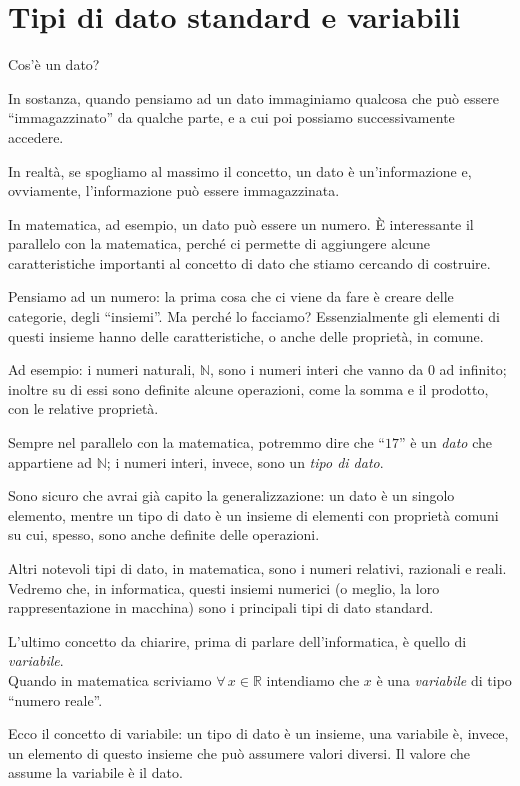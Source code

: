 
	\chapter{Tipi di dato standard e variabili}
	Cos'è un dato? 

	In sostanza, quando pensiamo ad un dato immaginiamo qualcosa che può essere ``immagazzinato'' da qualche parte, e a cui poi possiamo successivamente accedere. 
	
	In realtà, se spogliamo al massimo il concetto, un dato è un'informazione e, ovviamente, l'informazione può essere immagazzinata.
	
	In matematica, ad esempio, un dato può essere un numero. \`E interessante il parallelo con la matematica, perché ci permette di aggiungere alcune caratteristiche importanti al concetto di dato che stiamo cercando di costruire. 
	
	Pensiamo ad un numero: la prima cosa che ci viene da fare è creare delle categorie, degli ``insiemi''. Ma perché lo facciamo? Essenzialmente gli elementi di questi insieme hanno delle caratteristiche, o anche delle proprietà, in comune. 
	
	Ad esempio: i numeri naturali, $\mathbb{N}$, sono i numeri interi che vanno da $0$ ad infinito; inoltre su di essi sono definite alcune operazioni, come la somma e il prodotto, con le relative proprietà. 
	
	Sempre nel parallelo con la matematica, potremmo dire che ``$17$'' è un \emph{dato} che appartiene ad $\mathbb{N}$; i numeri interi, invece, sono un \emph{tipo di dato}. 
	
	Sono sicuro che avrai già capito la generalizzazione: un dato è un singolo elemento, mentre un tipo di dato è un insieme di elementi con proprietà comuni su cui, spesso, sono anche definite delle operazioni. 
	
	Altri notevoli tipi di dato, in matematica, sono i numeri relativi, razionali e reali. Vedremo che, in informatica, questi insiemi numerici (o meglio, la loro rappresentazione in macchina) sono i principali tipi di dato standard.
	
	L'ultimo concetto da chiarire, prima di parlare dell'informatica, è quello di \emph{variabile}. 
	\\ Quando in matematica scriviamo $\forall \, x \in \mathbb{R}$ intendiamo che $x$ è una \emph{variabile} di tipo ``numero reale''. 
	
	Ecco il concetto di variabile: un tipo di dato è un insieme, una variabile è, invece, un elemento di questo insieme che può assumere valori diversi. Il valore che assume la variabile è il dato.
	
